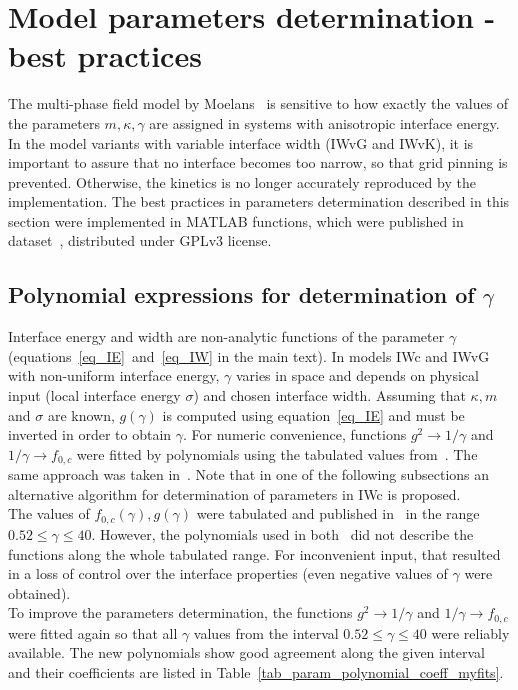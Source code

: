 \chapter{Model parameters determination - best practices}
\label{sec_suppl_param_det}
The multi-phase field model by Moelans~\cite{Moelans2008} is sensitive to how exactly the values of the parameters $m, \kappa, \gamma$ are assigned in systems with anisotropic interface energy. In the model variants with variable interface width (IWvG and IWvK), it is important to assure that no interface becomes too narrow, so that grid pinning is prevented. Otherwise, the kinetics is no longer accurately reproduced by the implementation. The best practices in parameters determination described in this section were implemented in MATLAB functions, which were published in dataset~\cite{Minar2022dataset}, distributed under GPLv3 license.

\section{Polynomial expressions for determination of $\gamma$} \label{sec_param_det_polynomials}
Interface energy and width are non-analytic functions of the parameter $\gamma$  (equations~\eqref{eq_IE}~and~\eqref{eq_IW} in the main text). In models IWc and IWvG with non-uniform interface energy, $\gamma$ varies in space and depends on physical input (local interface energy $\sigma$) and chosen interface width. Assuming that $\kappa,m$ and $\sigma$ are known, $g(\gamma)$ is computed using equation~\eqref{eq_IE} and must be inverted in order to obtain $\gamma$. For numeric convenience, functions $g^2\rightarrow 1/\gamma$ and $ 1/\gamma \rightarrow f_{0,c}$ were fitted by polynomials using the tabulated values from~\cite{Ravash2017}. The same approach was taken in~\cite{Moelans2008}. Note that in one of the following subsections an alternative algorithm for determination of parameters in IWc is proposed. \\
The values of $f_{0,c}(\gamma),g(\gamma)$ were tabulated and published in~\cite{Ravash2017} in the range $0.52\leq\gamma\leq 40$. However, the polynomials used in both~\cite{Moelans2008,Ravash2017} did not describe the functions along the whole tabulated range. For inconvenient input, that resulted in a loss of control over the interface properties (even negative values of $\gamma$ were obtained). \\
To improve the parameters determination, the functions $g^2\rightarrow 1/\gamma$ and $ 1/\gamma \rightarrow f_{0,c}$ were fitted again so that all $\gamma$ values from the interval $0.52\leq\gamma\leq 40$ were reliably available. The new polynomials show good agreement along the given interval and their coefficients are listed in Table~\ref{tab_param_polynomial_coeff_myfits}. 

